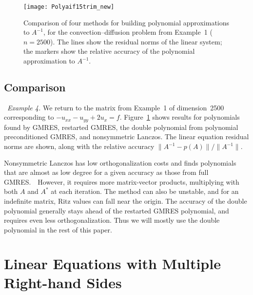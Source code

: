 \documentclass{siamart}
\begin{document}
\begin{figure}[t!]
\begin{center}
\texttt{[image: Polyaif15trim\_new]}
\end{center}

\vspace*{-6pt}
\caption{Comparison of four methods for building polynomial approximations to $A^{-1}$, for the convection--diffusion problem from Example~1 ($n=2500$).  The lines show the residual norms of the linear system; the markers show the relative accuracy of the polynomial approximation to $A^{-1}$.}
\label{fig:AltMeths}
\end{figure}

\subsection{Comparison}
\ 
{\it Example 4.} 
We return to the matrix from Example~1 of dimension~2500 corresponding to  $- u_{xx} - u_{yy} + 2 u_{x} = f $.
Figure~\ref{fig:AltMeths} shows results for polynomials found by  GMRES, restarted GMRES, the double polynomial from polynomial preconditioned GMRES, and nonsymmetric Lanczos.  The linear equation residual norms are shown, along with the relative accuracy $\|A^{-1} - p(A)\| / \|A^{-1}\|$.  


Nonsymmetric Lanczos has low orthogonalization costs and finds polynomials that are almost as low degree for a given accuracy as those from full GMRES.\ \  However, it requires more matrix-vector products, multiplying with both $A$ and $A^*$ at each iteration.  The method can also be unstable, and for an indefinite matrix, Ritz values can  fall near the origin. 
The accuracy of the double polynomial generally stays ahead of the restarted GMRES polynomial, and requires even less orthogonalization. 
Thus we will mostly use the double polynomial in the rest of this paper.

\section{Linear Equations with Multiple Right-hand Sides} \label{sec:mult_rhs}
\end{document}
